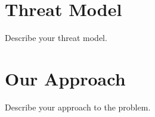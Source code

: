 \section{Threat Model}
\label{sec:threat}

Describe your threat model.

\section{Our Approach}
\label{sec:approach}

Describe your approach to the problem.
